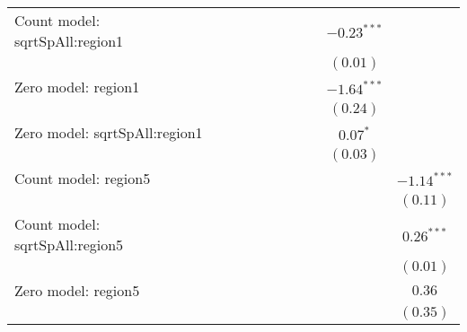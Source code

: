 \begin{table}
\begin{center}
{\begin{tabular}{l c c c c c c c c c}
Count model: sqrtSpAll:region1 &                &                &                &                 &                &                 &                 & $-0.23^{***}$   &                \\
                               &                &                &                &                 &                &                 &                 & $(0.01)$        &                \\
Zero model: region1            &                &                &                &                 &                &                 &                 & $-1.64^{***}$   &                \\
                               &                &                &                &                 &                &                 &                 & $(0.24)$        &                \\
Zero model: sqrtSpAll:region1  &                &                &                &                 &                &                 &                 & $0.07^{*}$      &                \\
                               &                &                &                &                 &                &                 &                 & $(0.03)$        &                \\
Count model: region5           &                &                &                &                 &                &                 &                 &                 & $-1.14^{***}$  \\
                               &                &                &                &                 &                &                 &                 &                 & $(0.11)$       \\
Count model: sqrtSpAll:region5 &                &                &                &                 &                &                 &                 &                 & $0.26^{***}$   \\
                               &                &                &                &                 &                &                 &                 &                 & $(0.01)$       \\
Zero model: region5            &                &                &                &                 &                &                 &                 &                 & $0.36$         \\
                               &                &                &                &                 &                &                 &                 &                 & $(0.35)$       \\

\end{tabular}}
\end{center}
\end{table}
